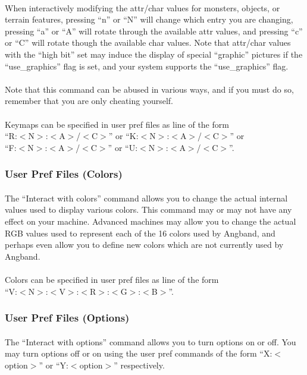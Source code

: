 \paragraph{}When interactively modifying the attr/char values for
monsters, objects, or terrain features, pressing ``n'' or ``N'' will
change which entry you are changing, pressing ``a'' or ``A'' will rotate
through the available attr values, and pressing ``c'' or ``C'' will rotate
though the available char values. Note that attr/char values with the
``high bit'' set may induce the display of special ``graphic'' pictures if
the ``use\_graphics'' flag is set, and your system supports the
``use\_graphics'' flag.

\paragraph{}Note that this command can be abused in various ways, and if
you must do so, remember that you are only cheating yourself.

\paragraph{}Keymaps can be specified in user pref files as line of the
form\\
``R:$<$N$>$:$<$A$>$/$<$C$>$'' or ``K:$<$N$>$:$<$A$>$/$<$C$>$'' or\\
``F:$<$N$>$:$<$A$>$/$<$C$>$'' or ``U:$<$N$>$:$<$A$>$/$<$C$>$''.

\subsubsection{User Pref Files (Colors)}
\paragraph{}The ``Interact with colors'' command allows you to change the actual
internal values used to display various colors. This command may or may
not have any effect on your machine. Advanced machines may allow you to
change the actual RGB values used to represent each of the 16 colors used
by Angband, and perhaps even allow you to define new colors which are not
currently used by Angband.

\paragraph{}Colors can be specified in user pref files as line of the
form\\
``V:$<$N$>$:$<$V$>$:$<$R$>$:$<$G$>$:$<$B$>$''.

\subsubsection{User Pref Files (Options)}
\paragraph{}The ``Interact with options'' command allows you to turn options
on or off. You may turn options off or on using the user pref commands
of the form ``X:$<$option$>$'' or ``Y:$<$option$>$'' respectively.

